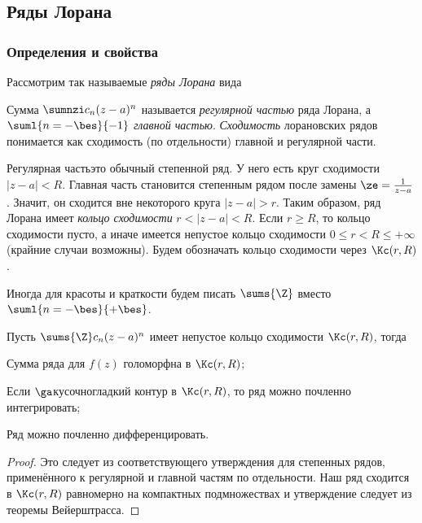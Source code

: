 \documentclass[a4paper]{article}
\begin{document}
\subsection{Ряды Лорана}

\subsubsection{Определения и свойства}

Рассмотрим так называемые \emph{ряды Лорана} вида

\begin{df}
Сумма $\sumnzi c_n(z-a)^n$ называется \emph{регулярной частью} ряда Лорана, а $\suml{n=-\bes}{-1}$\т
\emph{главной частью}. \emph{Сходимость} лорановских рядов понимается как сходимость (по отдельности)
главной и регулярной части.
\end{df}

Регулярная часть\т это обычный степенной ряд. У него есть круг сходимости $|z-a| < R$.
Главная часть становится степенным рядом после замены $\ze = \frac{1}{z-a}$. Значит,
он сходится вне некоторого круга $|z-a| > r$. Таким образом, ряд Лорана
имеет \emph{кольцо сходимости} $r < |z-a| < R$. Если $r\ge R$, то кольцо сходимости пусто, а иначе
имеется непустое кольцо сходимости $0\le r < R \le +\infty$ (крайние случаи возможны).
Будем обозначать кольцо сходимости через $\Kc(r,R)$.

Иногда для красоты и краткости будем писать $\sums{\Z}$ вместо $\suml{n=-\bes}{+\bes}$.

\begin{stm}
Пусть $\sums{\Z}c_n(z-a)^n$ имеет непустое кольцо сходимости $\Kc(r,R)$, тогда
\begin{nums}{-2}
\item Сумма ряда для $f(z)$ голоморфна в $\Kc(r,R)$;
\item Если $\ga$\т кусочно\д гладкий контур в $\Kc(r,R)$, то ряд можно почленно интегрировать;
\item Ряд можно почленно дифференцировать.
\end{nums}
\end{stm}
\begin{proof}
Это следует из соответствующего утверждения для степенных рядов, применённого к регулярной и
главной частям по отдельности. Наш ряд сходится в $\Kc(r,R)$ равномерно на компактных
подмножествах и утверждение следует из теоремы Вейерштрасса.
\end{proof}
\end{document}
